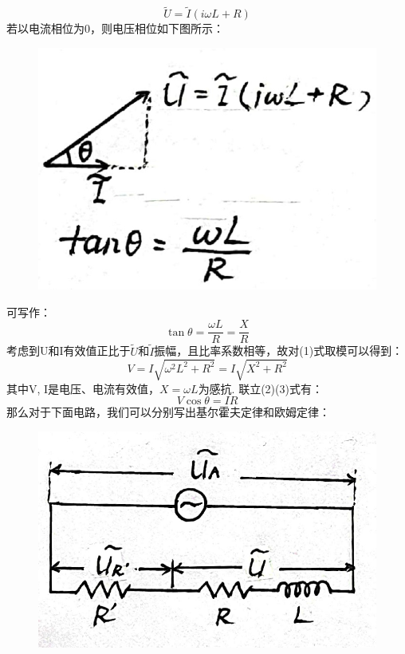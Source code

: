 \documentclass[UTF8]{ctexart}
\begin{document}
\begin{equation}
    \tilde{U}=\tilde{I}(i\omega L+R)
\end{equation}
若以电流相位为0，则电压相位如下图所示：
\begin{figure}[H]\begin{center}
    \includegraphics*[scale = 0.25]{2.png}
\end{center}\end{figure}
\vspace{-2em}
可写作：
\begin{equation}
    \tan\theta=\frac{\omega L}{R}=\frac{X}{R}
\end{equation}
考虑到U和I有效值正比于$\tilde{U}$和$\tilde{I}$振幅，且比率系数相等，故对(1)式取模可以得到：
\begin{equation}
    V=I\sqrt{\omega^2 L^2+R^2}=I\sqrt{X^2+R^2}
\end{equation}
其中V, I是电压、电流有效值，$X=\omega L$为感抗. 联立(2)(3)式有：
\begin{equation}
    V\cos\theta=IR
\end{equation}
那么对于下面电路，我们可以分别写出基尔霍夫定律和欧姆定律：
\begin{figure}[H]\begin{center}
    \includegraphics*[scale = 0.4]{3.png}
\end{center}\end{figure}
\end{document}
